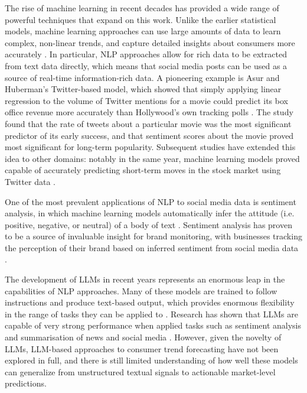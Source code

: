\documentclass{report}
\begin{document}
The rise of machine learning in recent decades has provided a wide range of powerful techniques that expand on this work. Unlike the earlier statistical models, machine learning approaches can use large amounts of data to learn complex, non-linear trends, and capture detailed insights about consumers more accurately \cite{shmueli2011predictive}. In particular, NLP approaches allow for rich data to be extracted from text data directly, which means that social media posts can be used as a source of real-time information-rich data. A pioneering example is Asur and Huberman’s Twitter-based model, which showed that simply applying linear regression to the volume of Twitter mentions for a movie could predict its box office revenue more accurately than Hollywood’s own tracking polls \cite{Asur2010predicting}. The study found that the rate of tweets about a particular movie was the most significant predictor of its early success, and that sentiment scores about the movie proved most significant for long-term popularity. Subsequent studies have extended this idea to other domains: notably in the same year, machine learning models proved capable of accurately predicting short-term moves in the stock market using Twitter data \cite{bollen2011twitter}.

One of the most prevalent applications of NLP to social media data is sentiment analysis, in which machine learning models automatically infer the attitude (i.e. positive, negative, or neutral) of a body of text \cite{liu2022sentiment}. Sentiment analysis has proven to be a source of invaluable insight for brand monitoring, with businesses tracking the perception of their brand based on inferred sentiment from social media data \cite{benedetto2016big}.

The development of LLMs in recent years represents an enormous leap in the capabilities of NLP approaches. Many of these models are trained to follow instructions and produce text-based output, which provides enormous flexibility in the range of tasks they can be applied to \cite{NEURIPS2020_1457c0d6}. Research has shown that LLMs are capable of very strong performance when applied tasks such as sentiment analysis\cite{zhang2023enhancing} and summarisation of news and social media \cite{zhao2024revolutionizing}. However, given the novelty of LLMs, LLM-based approaches to consumer trend forecasting have not been explored in full, and there is still limited understanding of how well these models can generalize from unstructured textual signals to actionable market-level predictions.
\end{document}
